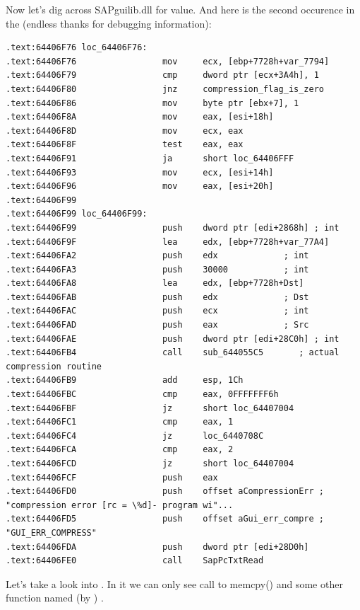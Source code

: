 {Now let's dig across SAPguilib.dll for  value. And here is the second occurence in 
the  (endless thanks for debugging information):}

\begin{lstlisting}
.text:64406F76 loc_64406F76:
.text:64406F76                 mov     ecx, [ebp+7728h+var_7794]
.text:64406F79                 cmp     dword ptr [ecx+3A4h], 1
.text:64406F80                 jnz     compression_flag_is_zero
.text:64406F86                 mov     byte ptr [ebx+7], 1
.text:64406F8A                 mov     eax, [esi+18h]
.text:64406F8D                 mov     ecx, eax
.text:64406F8F                 test    eax, eax
.text:64406F91                 ja      short loc_64406FFF
.text:64406F93                 mov     ecx, [esi+14h]
.text:64406F96                 mov     eax, [esi+20h]
.text:64406F99
.text:64406F99 loc_64406F99:
.text:64406F99                 push    dword ptr [edi+2868h] ; int
.text:64406F9F                 lea     edx, [ebp+7728h+var_77A4]
.text:64406FA2                 push    edx             ; int
.text:64406FA3                 push    30000           ; int
.text:64406FA8                 lea     edx, [ebp+7728h+Dst]
.text:64406FAB                 push    edx             ; Dst
.text:64406FAC                 push    ecx             ; int
.text:64406FAD                 push    eax             ; Src
.text:64406FAE                 push    dword ptr [edi+28C0h] ; int
.text:64406FB4                 call    sub_644055C5       ; actual compression routine
.text:64406FB9                 add     esp, 1Ch
.text:64406FBC                 cmp     eax, 0FFFFFFF6h
.text:64406FBF                 jz      short loc_64407004
.text:64406FC1                 cmp     eax, 1
.text:64406FC4                 jz      loc_6440708C
.text:64406FCA                 cmp     eax, 2
.text:64406FCD                 jz      short loc_64407004
.text:64406FCF                 push    eax
.text:64406FD0                 push    offset aCompressionErr ; "compression error [rc = \%d]- program wi"...
.text:64406FD5                 push    offset aGui_err_compre ; "GUI_ERR_COMPRESS"
.text:64406FDA                 push    dword ptr [edi+28D0h]
.text:64406FE0                 call    SapPcTxtRead
\end{lstlisting}

{Let's take a look into . In it we can only see call to memcpy() and some other function named 
(by \IDA) .}

